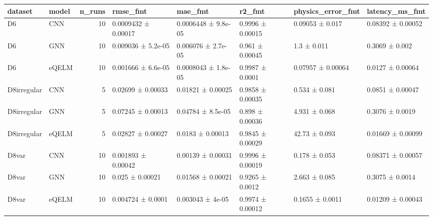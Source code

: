\begin{tabular}{llrlllll}
\toprule
dataset & model & n_runs & rmse_fmt & mae_fmt & r2_fmt & physics_error_fmt & latency_ms_fmt \\
\midrule
D6 & CNN & 10 & 0.0009432 ± 0.00017 & 0.0006448 ± 9.8e-05 & 0.9996 ± 0.00015 & 0.09053 ± 0.017 & 0.08392 ± 0.00052 \\
D6 & GNN & 10 & 0.009036 ± 5.2e-05 & 0.006076 ± 2.7e-05 & 0.961 ± 0.00045 & 1.3 ± 0.011 & 0.3069 ± 0.002 \\
D6 & eQELM & 10 & 0.001666 ± 6.6e-05 & 0.0008043 ± 1.8e-05 & 0.9987 ± 0.0001 & 0.07957 ± 0.00064 & 0.0127 ± 0.00064 \\
D8irregular & CNN & 5 & 0.02699 ± 0.00033 & 0.01821 ± 0.00025 & 0.9858 ± 0.00035 & 0.534 ± 0.081 & 0.0851 ± 0.00047 \\
D8irregular & GNN & 5 & 0.07245 ± 0.00013 & 0.04784 ± 8.5e-05 & 0.898 ± 0.00036 & 4.931 ± 0.068 & 0.3076 ± 0.0019 \\
D8irregular & eQELM & 5 & 0.02827 ± 0.00027 & 0.0183 ± 0.00013 & 0.9845 ± 0.00029 & 42.73 ± 0.093 & 0.01669 ± 0.00099 \\
D8var & CNN & 10 & 0.001893 ± 0.00042 & 0.00139 ± 0.00031 & 0.9996 ± 0.00019 & 0.178 ± 0.053 & 0.08371 ± 0.00057 \\
D8var & GNN & 10 & 0.025 ± 0.00021 & 0.01568 ± 0.00021 & 0.9265 ± 0.0012 & 2.663 ± 0.085 & 0.3075 ± 0.0014 \\
D8var & eQELM & 10 & 0.004724 ± 0.0001 & 0.003043 ± 4e-05 & 0.9974 ± 0.00012 & 0.1655 ± 0.0011 & 0.01209 ± 0.00043 \\
\bottomrule
\end{tabular}

